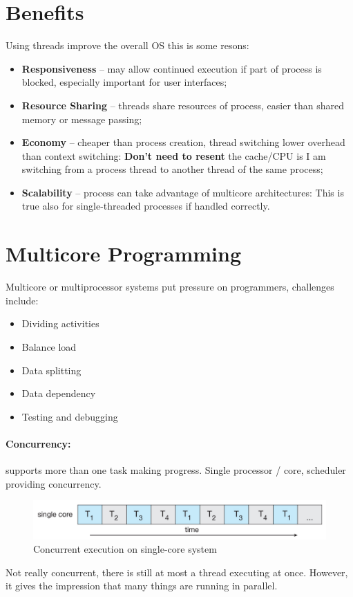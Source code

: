 \section{Benefits}
Using threads improve the overall OS this is some resons:
\begin{itemize}
    \item \textbf{Responsiveness} -- may allow continued execution if part of
    process is blocked, especially important for user interfaces;
    
    \item \textbf{Resource Sharing} -- threads share resources of process, easier
    than shared memory or message passing;
    
    \item \textbf{Economy} -- cheaper than process creation, thread switching
        lower overhead than context switching: \textbf{Don’t need to resent} the cache/CPU is I am switching from a
        process thread to another thread of the same process;
        
    \item \textbf{Scalability} -- process can take advantage of multicore
    architectures: This is true also for single-threaded processes if handled
correctly.
\end{itemize}

\newpage
\section{Multicore Programming}

Multicore or multiprocessor systems put pressure on programmers,
challenges include:

\begin{itemize}
    \item[] Dividing activities
    \item[] Balance load
    \item[] Data splitting
    \item[] Data dependency
    \item[] Testing and debugging
\end{itemize}


\paragraph{Concurrency: } supports more than one task making progress. Single processor / core, scheduler providing concurrency.
\begin{figure}[htbp]
    \centering
    \includegraphics[width=0.7\linewidth]{img/CONCURRENT.png}
    \caption{Concurrent execution on single-core system}
    
\end{figure}
Not really concurrent, there is still at most a thread executing at once. However, it gives the impression that many things are running in
parallel.

